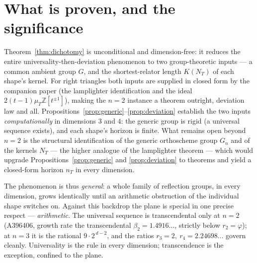 \documentclass[11pt]{article}
\newcommand{\Z}{\mathbb{Z}}
\theoremstyle{definition}
\begin{document}
\section{What is proven, and the significance}

Theorem~\ref{thm:dichotomy} is unconditional and dimension-free: it reduces the entire
universality-then-deviation phenomenon to two group-theoretic inputs --- a common ambient group
$G$, and the shortest-relator length $K(N_T)$ of each shape's kernel. For right triangles both
inputs are supplied in closed form by the companion paper (the lamplighter identification and the
ideal $2(t-1)\mu_T\Z[t^{\pm1}]$), making the $n=2$ instance a theorem outright, deviation law and
all. Propositions~\ref{prop:generic}--\ref{prop:deviation} establish the two inputs
\emph{computationally} in dimensions $3$ and $4$: the generic group is rigid (a universal sequence
exists), and each shape's horizon is finite. What remains open beyond $n=2$ is the structural
identification of the generic orthoscheme group $G_n$ and of the kernels $N_T$ --- the higher
analogue of the lamplighter theorem --- which would upgrade Propositions~\ref{prop:generic} and
\ref{prop:deviation} to theorems and yield a closed-form horizon $n_T$ in every dimension.

The phenomenon is thus \emph{general}: a whole family of reflection groups, in every dimension,
grows identically until an arithmetic obstruction of the individual shape switches on. Against this
backdrop the plane is special in one precise respect --- \emph{arithmetic}. The universal sequence
is transcendental only at $n=2$ (A396406, growth rate the transcendental $\beta_2=1.4916\dots$,
strictly below $r_2=\varphi$); at $n=3$ it is the rational $9\cdot2^{\,d-2}$, and the ratios
$r_3=2,\ r_4=2.24698\dots$ govern cleanly. Universality is the rule in every dimension;
transcendence is the exception, confined to the plane.
\end{document}
